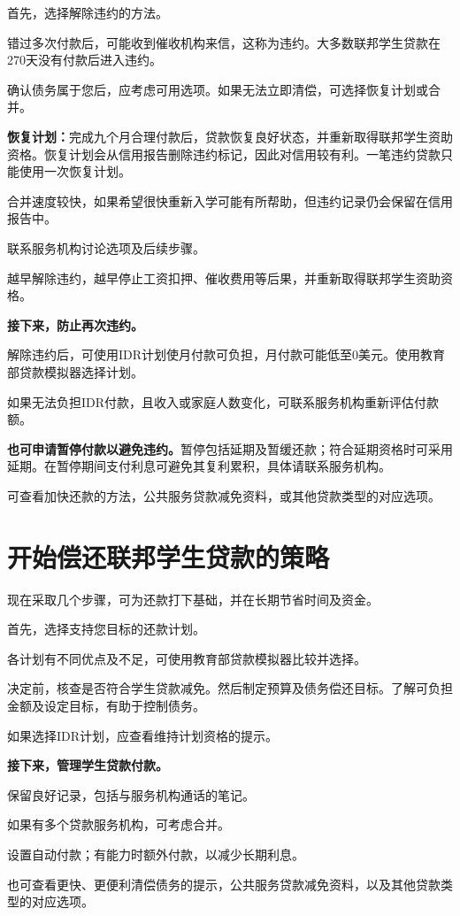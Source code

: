 \documentclass[UTF8,fontset=none,11pt,a4paper]{ctexart}
\begin{document}
首先，选择解除违约的方法。


错过多次付款后，可能收到催收机构来信，这称为违约。大多数联邦学生贷款在270天没有付款后进入违约。


确认债务属于您后，应考虑可用选项。如果无法立即清偿，可选择恢复计划或合并。


\textbf{恢复计划：}完成九个月合理付款后，贷款恢复良好状态，并重新取得联邦学生资助资格。恢复计划会从信用报告删除违约标记，因此对信用较有利。一笔违约贷款只能使用一次恢复计划。


合并速度较快，如果希望很快重新入学可能有所帮助，但违约记录仍会保留在信用报告中。


联系服务机构讨论选项及后续步骤。


越早解除违约，越早停止工资扣押、催收费用等后果，并重新取得联邦学生资助资格。


\textbf{接下来，防止再次违约。}


解除违约后，可使用IDR计划使月付款可负担，月付款可能低至0美元。使用教育部贷款模拟器选择计划。


如果无法负担IDR付款，且收入或家庭人数变化，可联系服务机构重新评估付款额。


\textbf{也可申请暂停付款以避免违约。}暂停包括延期及暂缓还款；符合延期资格时可采用延期。在暂停期间支付利息可避免其复利累积，具体请联系服务机构。


可查看加快还款的方法，公共服务贷款减免资料，或其他贷款类型的对应选项。


\section*{开始偿还联邦学生贷款的策略}
现在采取几个步骤，可为还款打下基础，并在长期节省时间及资金。


首先，选择支持您目标的还款计划。


各计划有不同优点及不足，可使用教育部贷款模拟器比较并选择。


决定前，核查是否符合学生贷款减免。然后制定预算及债务偿还目标。了解可负担金额及设定目标，有助于控制债务。


如果选择IDR计划，应查看维持计划资格的提示。


\textbf{接下来，管理学生贷款付款。}


保留良好记录，包括与服务机构通话的笔记。


如果有多个贷款服务机构，可考虑合并。


设置自动付款；有能力时额外付款，以减少长期利息。


也可查看更快、更便利清偿债务的提示，公共服务贷款减免资料，以及其他贷款类型的对应选项。
\end{document}
